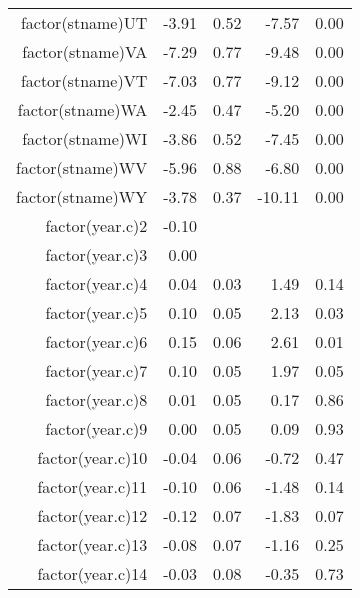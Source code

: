 \begin{table}[ht]
\begin{tabular}{rrrrr}
  factor(stname)UT & -3.91 & 0.52 & -7.57 & 0.00 \\ 
  factor(stname)VA & -7.29 & 0.77 & -9.48 & 0.00 \\ 
  factor(stname)VT & -7.03 & 0.77 & -9.12 & 0.00 \\ 
  factor(stname)WA & -2.45 & 0.47 & -5.20 & 0.00 \\ 
  factor(stname)WI & -3.86 & 0.52 & -7.45 & 0.00 \\ 
  factor(stname)WV & -5.96 & 0.88 & -6.80 & 0.00 \\ 
  factor(stname)WY & -3.78 & 0.37 & -10.11 & 0.00 \\ 
  factor(year.c)2 & -0.10 &  &  &  \\ 
  factor(year.c)3 & 0.00 &  &  &  \\ 
  factor(year.c)4 & 0.04 & 0.03 & 1.49 & 0.14 \\ 
  factor(year.c)5 & 0.10 & 0.05 & 2.13 & 0.03 \\ 
  factor(year.c)6 & 0.15 & 0.06 & 2.61 & 0.01 \\ 
  factor(year.c)7 & 0.10 & 0.05 & 1.97 & 0.05 \\ 
  factor(year.c)8 & 0.01 & 0.05 & 0.17 & 0.86 \\ 
  factor(year.c)9 & 0.00 & 0.05 & 0.09 & 0.93 \\ 
  factor(year.c)10 & -0.04 & 0.06 & -0.72 & 0.47 \\ 
  factor(year.c)11 & -0.10 & 0.06 & -1.48 & 0.14 \\ 
  factor(year.c)12 & -0.12 & 0.07 & -1.83 & 0.07 \\ 
  factor(year.c)13 & -0.08 & 0.07 & -1.16 & 0.25 \\ 
  factor(year.c)14 & -0.03 & 0.08 & -0.35 & 0.73 \\ 
   \hline
\end{tabular}
\end{table}
